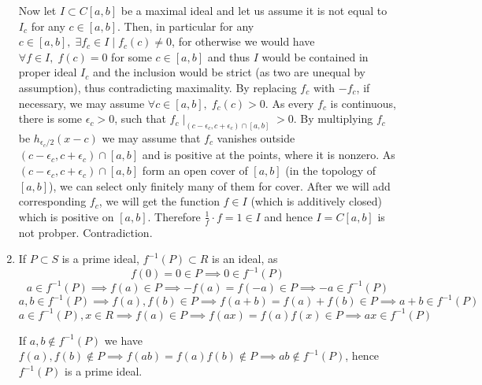 \documentclass[8pt]{article} %
\begin{document}
\begin{enumerate}[label=\bfseries Problem \arabic*.]
{\begin{enumerate}[label=(\arabic*)]
{				Now let $I\subset C[a,b]$ be a maximal ideal and let us assume it is not equal to $I_c$ for any $c\in[a,b]$.
				Then, in particular for any $c\in[a,b],\;\exists f_c\in I\mid f_c(c)\neq 0$, for otherwise we would have
				$\forall f\in I,\; f(c)=0$ for some $c\in[a,b]$ and thus $I$ would be contained in proper ideal $I_c$ and the
				inclusion would be strict (as two are unequal by assumption), thus contradicting maximality. By replacing
				$f_c$ with $-f_c$, if necessary, we may assume $\forall c\in[a,b],\;f_c(c)>0$. As every $f_c$ is continuous,
				there is some $\epsilon_c>0$, such that $f_c\mid_{(c-\epsilon_c,c+\epsilon_c)\cap [a,b]}>0$. By multiplying
				$f_c$ be $h_{\epsilon_c/2}(x-c)$ we may assume that $f_c$ vanishes outside $(c-\epsilon_c,c+\epsilon_c)\cap [a,b]$
				and is positive at the points, where it is nonzero.
				As $(c-\epsilon_c,c+\epsilon_c)\cap [a,b]$ form an open cover of $[a,b]$ (in the topology of $[a,b]$), we can
				select only finitely many of them for cover. After we will add corresponding $f_c$, we will get the function
				$f\in I$ (which is additively closed) which is positive on $[a,b]$. Therefore $\frac{1}{f}\cdot f=1\in I$ and
				hence $I=C[a,b]$ is not probper. Contradiction.
				}
		\end{enumerate}
		}
	\item{
		If $P\subset S$ is a prime ideal, $f^{-1}(P)\subset R$ is an ideal,
		as \[f(0)=0\in P\implies 0\in f^{-1}(P)\]
		\[a\in f^{-1}(P)\implies f(a)\in P\implies -f(a)=f(-a)\in P\implies -a\in f^{-1}(P)\]
		\[a,b\in f^{-1}(P)\implies f(a),f(b)\in P\implies f(a+b)=f(a)+f(b)\in P\implies a+b\in f^{-1}(P)\]
		\[a\in f^{-1}(P),x\in R\implies f(a)\in P\implies f(ax)=f(a)f(x)\in P\implies ax\in f^{-1}(P)\]
		
		If $a,b\notin f^{-1}(P)$ we have $f(a),f(b)\notin P\implies f(ab)=f(a)f(b)\notin P\implies
		ab\notin f^{-1}(P)$, hence $f^{-1}(P)$ is a prime ideal.
		}
\end{enumerate}
\end{document}

